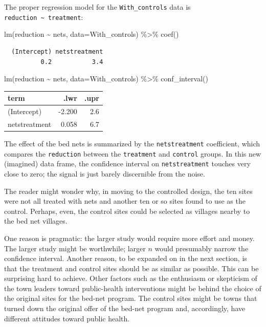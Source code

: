 \documentclass[
  letterpaper,
  DIV=11,
  numbers=noendperiod,
  oneside]{scrreprt}
\newenvironment{Shaded}{\begin{snugshade}}{\end{snugshade}}
\newcommand{\AttributeTok}[1]{\textcolor[rgb]{0.40,0.45,0.13}{#1}}
\newcommand{\FunctionTok}[1]{\textcolor[rgb]{0.28,0.35,0.67}{#1}}
\newcommand{\NormalTok}[1]{\textcolor[rgb]{0.00,0.23,0.31}{#1}}
\newcommand{\SpecialCharTok}[1]{\textcolor[rgb]{0.37,0.37,0.37}{#1}}
\begin{document}
{\begin{footnotesize}
The proper regression model for the \texttt{With\_controls} data is
\texttt{reduction\ \textasciitilde{}\ treatment}:

\begin{Shaded}
\begin{Highlighting}[]
\FunctionTok{lm}\NormalTok{(reduction }\SpecialCharTok{\textasciitilde{}}\NormalTok{ nets, }
       \AttributeTok{data=}\NormalTok{With\_controls) }\SpecialCharTok{\%\textgreater{}\%} 
  \FunctionTok{coef}\NormalTok{() }
\end{Highlighting}
\end{Shaded}

\begin{verbatim}
  (Intercept) netstreatment 
          0.2           3.4 
\end{verbatim}

\begin{Shaded}
\begin{Highlighting}[]
\FunctionTok{lm}\NormalTok{(reduction }\SpecialCharTok{\textasciitilde{}}\NormalTok{ nets, }
       \AttributeTok{data=}\NormalTok{With\_controls) }\SpecialCharTok{\%\textgreater{}\%} 
  \FunctionTok{conf\_interval}\NormalTok{() }
\end{Highlighting}
\end{Shaded}

\ttfamily 
\begin{tabular}{lrr}
\toprule
term & .lwr & .upr\\
\midrule
(Intercept) & -2.200 & 2.6\\
netstreatment & 0.058 & 6.7\\
\bottomrule
\end{tabular} \normalfont
\bigskip

The effect of the bed nets is summarized by the \texttt{netstreatment}
coefficient, which compares the \texttt{reduction} between the
\texttt{treatment} and \texttt{control} groups. In this new (imagined)
data frame, the confidence interval on \texttt{netstreatment} touches
very close to zero; the signal is just barely discernible from the
noise.

The reader might wonder why, in moving to the controlled design, the ten
sites were not all treated with nets and another ten or so sites found
to use as the control. Perhaps, even, the control sites could be
selected as villages nearby to the bed net villages.

One reason is pragmatic: the larger study would require more effort and
money. The larger study might be worthwhile; larger \(n\) would
presumably narrow the confidence interval. Another reason, to be
expanded on in the next section, is that the treatment and control sites
should be as similar as possible. This can be surprising hard to
achieve. Other factors such as the enthusiasm or skepticism of the town
leaders toward public-health interventions might be behind the choice of
the original sites for the bed-net program. The control sites might be
towns that turned down the original offer of the bed-net program and,
accordingly, have different attitudes toward public health.


\end{footnotesize}}
\end{document}
